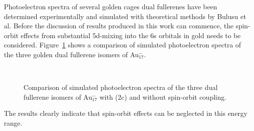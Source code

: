 Photoelectron spectra of several golden cages dual fullerenes have been
determined experimentally and simulated with theoretical methods by Bulusu et
al.\autocite{Bulusu_Evidencehollowgolden_2006} Before the discussion of results
produced in this work can commence, the spin-orbit effects from substantial
5d-mixing into the 6s orbitals in gold needs to be considered.
Figure~\ref{fig:photoSOAu17} shows a comparison of simulated photoelectron
spectra of the three golden dual fullerene isomers of Au$_{17}^-$.
%
\begin{figure}[htb]\centering
	\hfill
	\\
	\caption{Comparison of simulated photoelectron spectra of the three dual fullerene isomers of Au$_{17}^-$ with (2c) and without spin-orbit coupling.} 
	\label{fig:photoSOAu17}
\end{figure}
%
The results clearly indicate that spin-orbit effects can be neglected in this
energy range.

